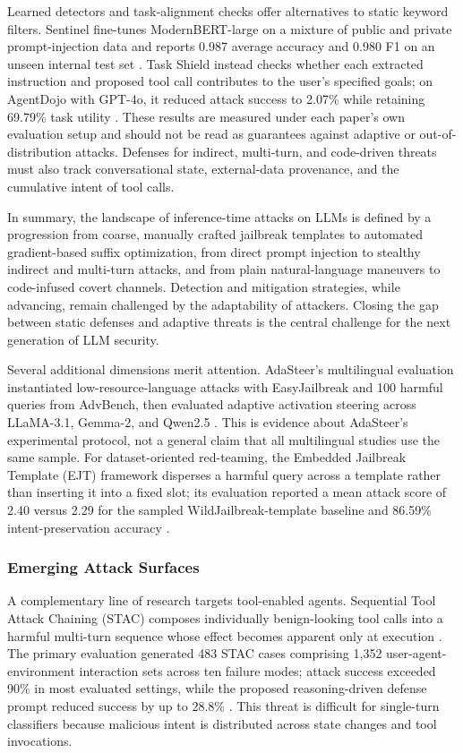 \documentclass[11pt,a4paper]{article}
\begin{document}
Learned detectors and task-alignment checks offer alternatives to static keyword filters. Sentinel fine-tunes ModernBERT-large on a mixture of public and private prompt-injection data and reports 0.987 average accuracy and 0.980 F1 on an unseen internal test set \cite{Ivry_2025_Sentinel_a518d27a}. Task Shield instead checks whether each extracted instruction and proposed tool call contributes to the user's specified goals; on AgentDojo with GPT-4o, it reduced attack success to 2.07\% while retaining 69.79\% task utility \cite{Jia_2025_LLM_604891e2}. These results are measured under each paper's own evaluation setup and should not be read as guarantees against adaptive or out-of-distribution attacks. Defenses for indirect, multi-turn, and code-driven threats must also track conversational state, external-data provenance, and the cumulative intent of tool calls.

In summary, the landscape of inference-time attacks on LLMs is defined by a progression from coarse, manually crafted jailbreak templates to automated gradient-based suffix optimization, from direct prompt injection to stealthy indirect and multi-turn attacks, and from plain natural-language maneuvers to code-infused covert channels. Detection and mitigation strategies, while advancing, remain challenged by the adaptability of attackers. Closing the gap between static defenses and adaptive threats is the central challenge for the next generation of LLM security.

Several additional dimensions merit attention. AdaSteer's multilingual evaluation instantiated low-resource-language attacks with EasyJailbreak and 100 harmful queries from AdvBench, then evaluated adaptive activation steering across LLaMA-3.1, Gemma-2, and Qwen2.5 \cite{Zhao_2025_LLM_45bb4e13}. This is evidence about AdaSteer's experimental protocol, not a general claim that all multilingual studies use the same sample. For dataset-oriented red-teaming, the Embedded Jailbreak Template (EJT) framework disperses a harmful query across a template rather than inserting it into a fixed slot; its evaluation reported a mean attack score of 2.40 versus 2.29 for the sampled WildJailbreak-template baseline and 86.59\% intent-preservation accuracy \cite{Kim_2025_LLM_2523db75}.

\subsubsection{Emerging Attack Surfaces}

A complementary line of research targets tool-enabled agents. Sequential Tool Attack Chaining (STAC) composes individually benign-looking tool calls into a harmful multi-turn sequence whose effect becomes apparent only at execution \cite{Li_2025_LLM_c2206a72}. The primary evaluation generated 483 STAC cases comprising 1,352 user-agent-environment interaction sets across ten failure modes; attack success exceeded 90\% in most evaluated settings, while the proposed reasoning-driven defense prompt reduced success by up to 28.8\% \cite{Li_2025_LLM_c2206a72}. This threat is difficult for single-turn classifiers because malicious intent is distributed across state changes and tool invocations.
\end{document}
